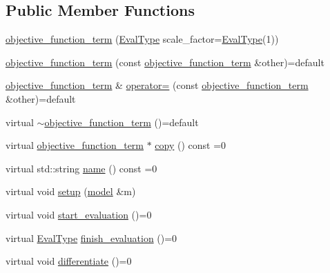 \subsection*{Public Member Functions}
\begin{DoxyCompactItemize}
\item 
\hyperlink{classlbann_1_1objective__function__term_a8c019e3c880f38dc20275e395acaeca1}{objective\+\_\+function\+\_\+term} (\hyperlink{base_8hpp_a3266f5ac18504bbadea983c109566867}{Eval\+Type} scale\+\_\+factor=\hyperlink{base_8hpp_a3266f5ac18504bbadea983c109566867}{Eval\+Type}(1))
\item 
\hyperlink{classlbann_1_1objective__function__term_a791a33056717d8b3f5ca2288145d86c8}{objective\+\_\+function\+\_\+term} (const \hyperlink{classlbann_1_1objective__function__term}{objective\+\_\+function\+\_\+term} \&other)=default
\item 
\hyperlink{classlbann_1_1objective__function__term}{objective\+\_\+function\+\_\+term} \& \hyperlink{classlbann_1_1objective__function__term_a8bbac194d96a854d5841817b67b63334}{operator=} (const \hyperlink{classlbann_1_1objective__function__term}{objective\+\_\+function\+\_\+term} \&other)=default
\item 
virtual \hyperlink{classlbann_1_1objective__function__term_ad95920d424b3c248a2124827971451df}{$\sim$objective\+\_\+function\+\_\+term} ()=default
\item 
virtual \hyperlink{classlbann_1_1objective__function__term}{objective\+\_\+function\+\_\+term} $\ast$ \hyperlink{classlbann_1_1objective__function__term_ae98a4ec173a602ad55d1df20dadd4cb9}{copy} () const =0
\item 
virtual std\+::string \hyperlink{classlbann_1_1objective__function__term_a964fbfad3dd0434aa8f32c5fedf1079a}{name} () const =0
\item 
virtual void \hyperlink{classlbann_1_1objective__function__term_a6c8dbdf18aac8676098189fb7b178e91}{setup} (\hyperlink{classlbann_1_1model}{model} \&m)
\item 
virtual void \hyperlink{classlbann_1_1objective__function__term_a0af4dfd71fb30e43d1ae7611172ad9b0}{start\+\_\+evaluation} ()=0
\item 
virtual \hyperlink{base_8hpp_a3266f5ac18504bbadea983c109566867}{Eval\+Type} \hyperlink{classlbann_1_1objective__function__term_a7a82f2cdbc954655ac860896306aed0c}{finish\+\_\+evaluation} ()=0
\item 
virtual void \hyperlink{classlbann_1_1objective__function__term_ad009c3cfbe1cf2fbb6cce015b16fdac5}{differentiate} ()=0

\end{DoxyCompactItemize}
